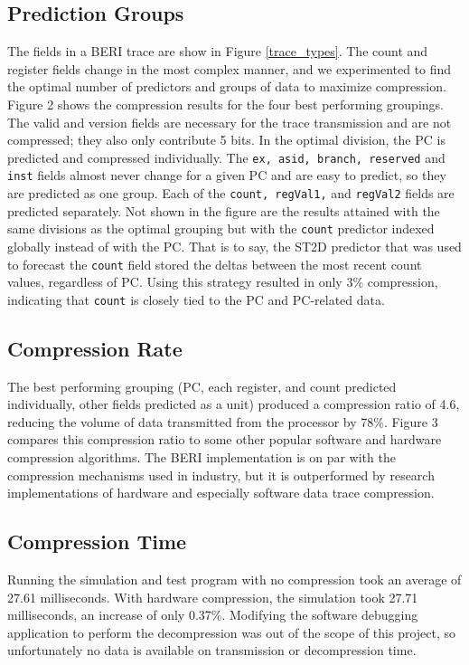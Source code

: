 \documentclass[conference]{IEEEtran}
\begin{document}
\subsection{Prediction Groups}
The fields in a BERI trace are show in Figure \ref{trace_types}. The count and register fields change in the most complex manner, and we experimented to find the optimal number of predictors and groups of data to maximize compression. Figure 2 shows the compression results for the four best performing groupings. The valid and version fields are necessary for the trace transmission and are not compressed; they also only contribute 5 bits. In the optimal division, the PC is predicted and compressed individually. The \texttt{ex, asid, branch, reserved} and \texttt{inst} fields almost never change for a given PC and are easy to predict, so they are predicted as one group. Each of the \texttt{count, regVal1,} and \texttt{regVal2} fields are predicted separately. Not shown in the figure are the results attained with the same divisions as the optimal grouping but with the \texttt{count} predictor indexed globally instead of with the PC. That is to say, the ST2D predictor that was used to forecast the \texttt{count} field stored the deltas between the most recent count values, regardless of PC. Using this strategy resulted in only 3\% compression, indicating that \texttt{count} is closely tied to the PC and PC-related data.

\subsection{Compression Rate}
The best performing grouping (PC, each register, and count predicted individually, other fields predicted as a unit) produced a compression ratio of 4.6, reducing the volume of data transmitted from the processor by 78\%. Figure 3 compares this compression ratio to some other popular software and hardware compression algorithms. The BERI implementation is on par with the compression mechanisms used in industry, but it is outperformed by research implementations of hardware and especially software data trace compression. 


\subsection{Compression Time}
Running the simulation and test program with no compression took an average of 27.61 milliseconds. With hardware compression, the simulation took 27.71 milliseconds, an increase of only 0.37\%. Modifying the software debugging application to perform the decompression was out of the scope of this project, so unfortunately no data is available on transmission or decompression time. 
\end{document}
